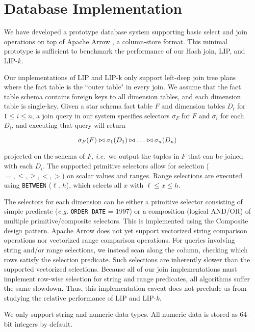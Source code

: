 

\section{Database Implementation}
\label{sec:implementation}

We have developed a prototype database system supporting basic select and join operations on top of Apache Arrow \cite{apachearrow}, a column-store format. This minimal prototype is sufficient to benchmark the performance of our Hash join, LIP, and LIP-$k$.

Our implementations of LIP and LIP-k only support left-deep join tree plans where the fact table is the ``outer table" in every join. We assume that the fact table schema contains foreign keys to all dimension tables, and each dimension table is single-key. Given a star schema fact table $F$ and dimension tables $D_i$ for $1 \leq i \leq n$, a join query in our system specifies selectors $\sigma_F$ for $F$ and $\sigma_i$ for each $D_i$, and executing that query will return 

$$\sigma_F(F) \bowtie \sigma_1(D_1) \bowtie \dots \bowtie \sigma_n(D_n)$$

\noindent projected on the schema of $F$, {\it i.e.}~we output the tuples in $F$ that can be joined with each $D_i$. The supported primitive selectors allow for selection ($=, \leq, \geq, <, >$) on scalar values and ranges. Range selections are executed using \texttt{BETWEEN} ($\ell$, $h$), which selects all $x$ with $\ell \leq x \leq h$. 

The selectors for each dimension can be either a primitive selector consisting of simple predicate ({\it e.g.} \texttt{ORDER DATE} = 1997) 
or a composition (logical AND/OR) of multiple primitive/composite selectors. 
This is implemented using the Composite design pattern.
Apache Arrow does not yet support vectorized string comparison operations nor vectorized range comparison operations.
For queries involving string and/or range selections, 
we instead scan along the column, checking which rows satisfy the selection predicate. 
Such selections are inherently slower than the supported vectorized selections. 
Because all of our join implementations must implement row-wise selection for string and range predicates, 
all algorithms suffer the same slowdown. 
Thus, this implementation caveat does not preclude us from studying the relative performance of LIP and LIP-$k$.

We only support string and numeric data types. All numeric data is stored as 64-bit integers by default.

